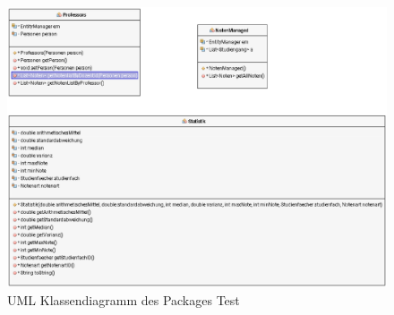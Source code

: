 \documentclass[12pt,a4paper,parskip]{scrreprt}
\begin{document}
\begin{figure}
	\centering
	\includegraphics[width=1\linewidth]{Diagramme/generated/package_test}
	\caption[Package Test]{UML Klassendiagramm des Packages \glqq Test\grqq}
	\label{fig:package_test}
\end{figure}
\end{document}

